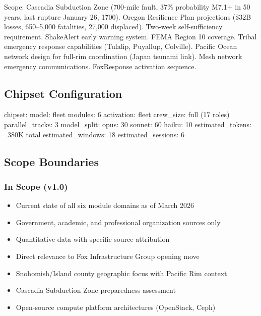 \documentclass[11pt,letterpaper]{article}
\begin{document}
Scope: Cascadia Subduction Zone (700-mile fault, 37\% probability M7.1+ in 50 years, last rupture January 26, 1700). Oregon Resilience Plan projections (\$32B losses, 650--5,000 fatalities, 27,000 displaced). Two-week self-sufficiency requirement. ShakeAlert early warning system. FEMA Region 10 coverage. Tribal emergency response capabilities (Tulalip, Puyallup, Colville). Pacific Ocean network design for full-rim coordination (Japan tsunami link). Mesh network emergency communications. FoxResponse activation sequence.

\subsection{Chipset Configuration}

\begin{asciibox}
chipset:
  model: fleet
  modules: 6
  activation: fleet
  crew_size: full (17 roles)
  parallel_tracks: 3
  model_split:
    opus: 30%
    sonnet: 60%
    haiku: 10%
  estimated_tokens: ~380K total
  estimated_windows: 18
  estimated_sessions: 6
\end{asciibox}

\subsection{Scope Boundaries}

\subsubsection{In Scope (v1.0)}

\begin{itemize}[leftmargin=2em]
\item Current state of all six module domains as of March 2026
\item Government, academic, and professional organization sources only
\item Quantitative data with specific source attribution
\item Direct relevance to Fox Infrastructure Group opening move
\item Snohomish/Island county geographic focus with Pacific Rim context
\item Cascadia Subduction Zone preparedness assessment
\item Open-source compute platform architectures (OpenStack, Ceph)
\end{itemize}
\end{document}
